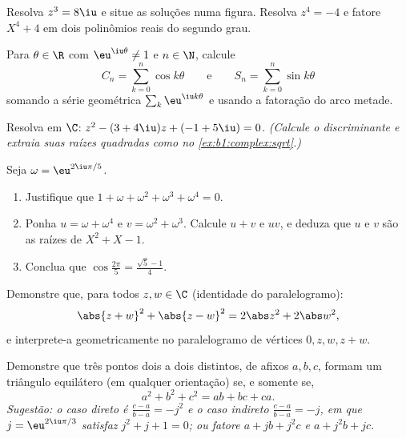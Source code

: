 \begin{exercise}[$\star$]\label{exo:b1:complex:5}
Resolva $z^3 = 8\iu$ e situe as soluções numa figura. Resolva
$z^4 = -4$ e fatore $X^4 + 4$ em dois polinômios reais do segundo grau.
\end{exercise}

\begin{exercise}[$\star\star$]\label{exo:b1:complex:6}
Para $\theta \in \R$ com $\eu^{\iu\theta} \neq 1$ e $n \in \N$,
calcule
\[
C_n = \sum_{k=0}^{n} \cos k\theta
\qquad\text{e}\qquad
S_n = \sum_{k=0}^{n} \sin k\theta
\]
somando a série geométrica $\sum_k \eu^{\iu k\theta}$ e usando
a fatoração do arco metade.
\end{exercise}

\begin{exercise}[$\star\star$]\label{exo:b1:complex:7}
Resolva em $\C$: $z^2 - (3 + 4\iu) z + (-1 + 5\iu) = 0$. \emph{(Calcule
o discriminante e extraia suas raízes quadradas como no
\cref{ex:b1:complex:sqrt}.)}
\end{exercise}

\begin{exercise}[$\star\star$]\label{exo:b1:complex:8}
Seja $\omega = \eu^{2\iu\pi/5}$.
\begin{enumerate}
  \item Justifique que $1 + \omega + \omega^2 + \omega^3 + \omega^4 = 0$.
  \item Ponha $u = \omega + \omega^4$ e $v = \omega^2 + \omega^3$.
        Calcule $u + v$ e $uv$, e deduza que $u$ e $v$ são as
        raízes de $X^2 + X - 1$.
  \item Conclua que $\cos\frac{2\pi}{5} = \frac{\sqrt 5 - 1}{4}$.
\end{enumerate}
\end{exercise}

\begin{exercise}[$\star\star$]\label{exo:b1:complex:9}
Demonstre que, para todos $z, w \in \C$ (identidade do paralelogramo):
\[
\abs{z + w}^2 + \abs{z - w}^2 = 2\abs z^2 + 2\abs w^2 ,
\]
e interprete-a geometricamente no paralelogramo de vértices $0,
z, w, z + w$.
\end{exercise}

\begin{exercise}[$\star\star\star$]\label{exo:b1:complex:10}
Demonstre que três pontos dois a dois distintos, de afixos $a, b, c$,
formam um triângulo equilátero (em qualquer orientação) se, e somente se,
\[
a^2 + b^2 + c^2 = ab + bc + ca .
\]
\emph{Sugestão: o caso direto é $\frac{c-a}{b-a} = -j^2$ e o
caso indireto $\frac{c-a}{b-a} = -j$, em que $j = \eu^{2\iu\pi/3}$
satisfaz $j^2 + j + 1 = 0$; ou fatore $a + jb + j^2c$ e $a + j^2 b
+ jc$.}
\end{exercise}

